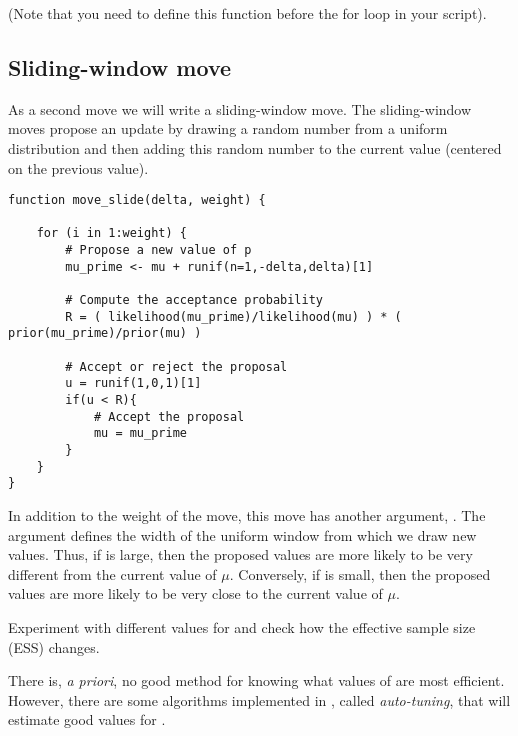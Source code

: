 (Note that you need to define this function before the for loop in your script).


\subsection{Sliding-window move}
As a second move we will write a sliding-window move.
The sliding-window moves propose an update by drawing a random number from a uniform distribution and then adding this random number to the current value (\IE centered on the previous value).
{\tt \begin{snugshade*}
\begin{lstlisting}    
function move_slide(delta, weight) {

    for (i in 1:weight) {
        # Propose a new value of p
        mu_prime <- mu + runif(n=1,-delta,delta)[1]

        # Compute the acceptance probability
        R = ( likelihood(mu_prime)/likelihood(mu) ) * ( prior(mu_prime)/prior(mu) ) 

        # Accept or reject the proposal
        u = runif(1,0,1)[1] 
        if(u < R){
            # Accept the proposal
            mu = mu_prime 
        }
    }
}
\end{lstlisting}
\end{snugshade*}}
In addition to the weight of the move, this move has another argument, .
The argument  defines the width of the uniform window from which we draw new values.
Thus, if  is large, then the proposed values are more likely to be very different from the current value of $\mu$.
Conversely, if  is small, then the proposed values are more likely to be very close to the current value of $\mu$.

{\begin{framed}
Experiment with different values for  and check how the effective sample size (ESS) changes.
\end{framed}}

There is, {\it a priori}, no good method for knowing what values of  are most efficient.
However, there are some algorithms implemented in \RevBayes, called \emph{auto-tuning}, that will estimate good values for .

